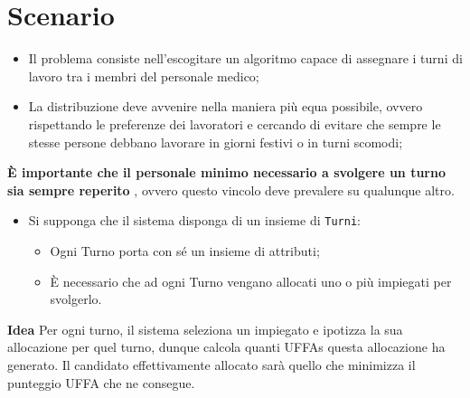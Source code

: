 \documentclass[compress]{beamer}
\begin{document}
    
\begin{frame}[plain]
    \titlepage
\end{frame}

\section{Scenario}
\begin{frame}{\secname}
    \onslide<+-> \begin{itemize}
        \item Il problema consiste nell'escogitare un algoritmo capace di assegnare
        i turni di lavoro tra i membri del personale medico;
        \item La distribuzione deve avvenire nella maniera più equa possibile, ovvero
        rispettando le preferenze dei lavoratori e cercando di evitare che sempre le
        stesse persone debbano lavorare in giorni festivi o in turni scomodi;
    \end{itemize}
    \onslide<+-> \begin{alertblock}{}
        \textbf{È importante che il personale minimo necessario a
        svolgere un turno sia sempre reperito} , ovvero questo vincolo deve
        prevalere su qualunque altro.        
    \end{alertblock}
\end{frame}
\begin{frame}{\secname}
    \onslide <+-> \begin{itemize}
        \item Si supponga che il sistema disponga di un insieme di \texttt{Turni}:
        \begin{itemize}
            \item Ogni Turno porta con sé un insieme di attributi;
            \item È necessario che ad ogni Turno vengano allocati uno o più impiegati
            per svolgerlo.
        \end{itemize}
    \end{itemize}
    \onslide<+-> \begin{block}{\textbf{Idea}}
        Per ogni turno, il sistema seleziona un impiegato e ipotizza la sua allocazione
        per quel turno, dunque calcola quanti UFFAs questa allocazione ha generato.
        Il candidato effettivamente allocato sarà quello che minimizza il punteggio
        UFFA che ne consegue.
    \end{block}
\end{frame}
\end{document}
